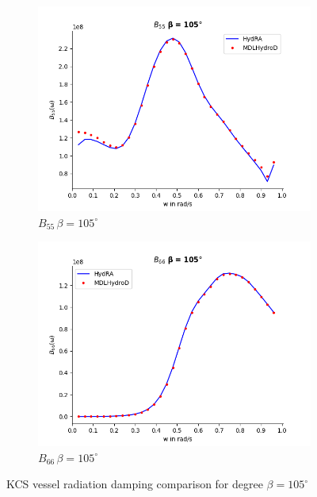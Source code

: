 \begin{figure}[H]
\begin{subfigure}[b]{0.45\textwidth}
        \includegraphics[width=\textwidth]{plots/kcs/rad_damp_deg_120/b55.png}
        \caption{$B_{55} \, \beta = 105^{\circ}$}
    \end{subfigure}
    \begin{subfigure}[b]{0.45\textwidth}
        \includegraphics[width=\textwidth]{plots/kcs/rad_damp_deg_120/b66.png}
        \caption{$B_{66} \, \beta = 105^{\circ}$}
    \end{subfigure}
    \caption{KCS vessel radiation damping comparison for degree $\beta= 105^{\circ}$}
    \label{fig:radition_damp_125}
\end{figure}

